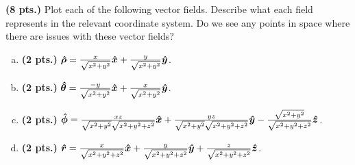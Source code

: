 \documentclass[12pt]{article} %
\newcommand{\rhat}{\boldsymbol{\hat{r}}}
\newcommand{\thetahat}{\boldsymbol{\hat{\theta}}}
\newcommand{\phihat}{\boldsymbol{\hat{\phi}}}
\newcommand{\rhohat}{\boldsymbol{\hat{\rho}}}
\begin{document}
\newpage
\begin{problem}
	\textbf{(8 pts.)} Plot each of the following vector fields. Describe what each field represents in the relevant coordinate system. Do we see any points in space where there are issues with these vector fields?
	\begin{enumerate}[(a)]
		\item \textbf{(2 pts.)} $\rhohat = \frac{x}{\sqrt{x^2+y^2}}\xhat + \frac{y}{\sqrt{x^2+y^2}}\yhat$.
		\item \textbf{(2 pts.)} $\thetahat = \frac{-y}{\sqrt{x^2+y^2}}\xhat + \frac{x}{\sqrt{x^2+y^2}}\yhat$.
		\item \textbf{(2 pts.)} $\phihat = \frac{xz}{\sqrt{x^2+y^2}\sqrt{x^2+y^2+z^2}}\xhat + \frac{yz}{\sqrt{x^2+y^2}\sqrt{x^2+y^2+z^2}}\yhat-\frac{\sqrt{x^2+y^2}}{\sqrt{x^2+y^2+z^2}}\zhat$.
		\item \textbf{(2 pts.)} $\rhat = \frac{x}{\sqrt{x^2+y^2+z^2}}\xhat + \frac{y}{\sqrt{x^2+y^2+z^2}}\yhat+\frac{z}{\sqrt{x^2+y^2+z^2}}\zhat$.
	\end{enumerate}
\end{problem}
\end{document}
